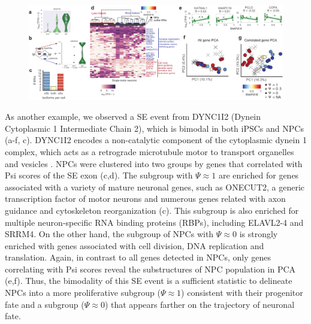 \clearpage
\begin{figure}[h]
\ContinuedFloat
\captionsetup{labelformat=empty}
\centering
\includegraphics[width=5.8in]{figures/hidden_cell_states_part1.pdf}
\end{figure}
\addtocounter{figure}{1}
\clearpage


As another example, we observed a SE event from DYNC1I2 (Dynein Cytoplasmic 1 Intermediate Chain 2), which is bimodal in both iPSCs and NPCs (a-f, c). DYNC1I2 encodes a non-catalytic component of the cytoplasmic dynein 1 complex, which acts as a retrograde microtubule motor to transport organelles and vesicles \cite{Crackower1999-cf}. NPCs were clustered into two groups by genes that correlated with Psi scores of the SE exon (c,d). The subgroup with $\Psi \approx 1$ are enriched for genes associated with a variety of mature neuronal genes, such as ONECUT2, a generic transcription factor of motor neurons and numerous genes related with axon guidance and cytoskeleton reorganization (c). This subgroup is also enriched for multiple neuron-specific RNA binding proteins (RBPs), including ELAVL2-4 and SRRM4. On the other hand, the subgroup of NPCs with $\Psi \approx 0$ is strongly enriched with genes associated with cell division, DNA replication and translation. Again, in contrast to all genes detected in NPCs, only genes correlating with Psi scores reveal the substructures of NPC population in PCA (e,f). Thus, the bimodality of this SE event is a sufficient statistic to delineate NPCs into a more proliferative subgroup ($\Psi \approx 1$) consistent with their progenitor fate and a subgroup ($\Psi \approx 0$) that appears farther on the trajectory of neuronal fate.

